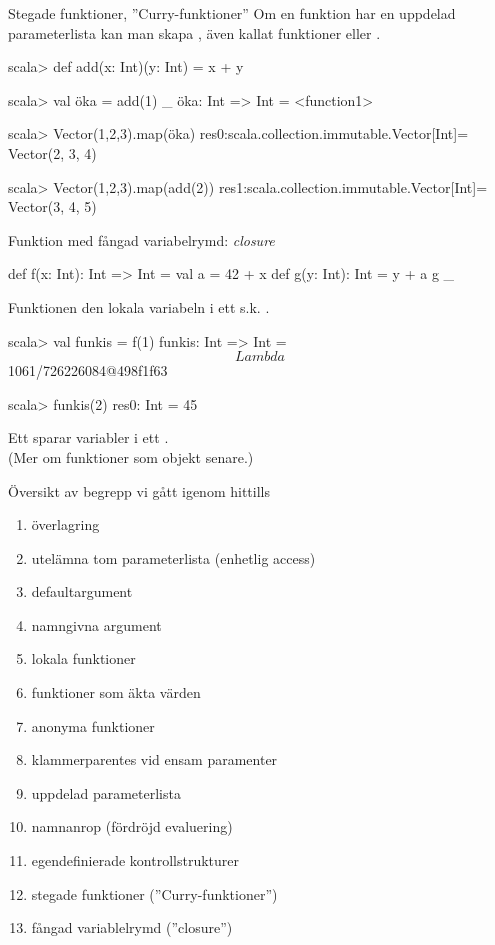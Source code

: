\begin{Slide}{Stegade funktioner, ''Curry-funktioner''}
Om en funktion har en uppdelad parameterlista kan man skapa , även kallat  funktioner  eller .
\begin{REPLnonum}
scala> def add(x: Int)(y: Int) = x + y

scala> val öka = add(1) _
öka: Int => Int = <function1>

scala> Vector(1,2,3).map(öka)
res0:scala.collection.immutable.Vector[Int]= Vector(2, 3, 4)

scala> Vector(1,2,3).map(add(2))
res1:scala.collection.immutable.Vector[Int]= Vector(3, 4, 5)
\end{REPLnonum}
\end{Slide}


\begin{Slide}{Funktion med fångad variabelrymd: \textit{closure}}
\begin{Code}
def f(x: Int): Int => Int = {
  val a = 42 + x
  def g(y: Int): Int = y + a
  g _
}
\end{Code}
Funktionen   den lokala variabeln  i ett s.k. .
\pause
\begin{REPLnonum}
scala> val funkis = f(1)
funkis: Int => Int = $$Lambda$$1061/726226084@498f1f63

scala> funkis(2)
res0: Int = 45
\end{REPLnonum}
\pause
Ett  sparar variabler i ett . \\
(Mer om funktioner som objekt senare.)
\end{Slide}

\ifkompendium\else
\begin{SlideExtra}{Översikt av begrepp vi gått igenom hittills}
\begin{enumerate}
\item överlagring
\item utelämna tom parameterlista (enhetlig access)
\item defaultargument
\item namngivna argument
\item lokala funktioner
\item funktioner som äkta värden
\item anonyma funktioner
\item klammerparentes vid ensam paramenter
\item uppdelad parameterlista
\item namnanrop (fördröjd evaluering)
\item egendefinierade kontrollstrukturer
\item stegade funktioner (''Curry-funktioner'')
\item fångad variablelrymd (''closure'')
\end{enumerate}
\end{SlideExtra}
\fi

